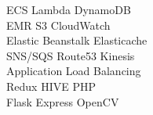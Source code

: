 \documentclass[]{deedy-resume-openfont}
\begin{document}
\begin{minipage}[t]{0.33\textwidth}
ECS \textbullet{} Lambda \textbullet{} DynamoDB  \\
EMR \textbullet{} S3 \textbullet{} CloudWatch \\
Elastic Beanstalk \textbullet{} Elasticache  \\
SNS/SQS \textbullet{} Route53 \textbullet{} Kinesis \\
Application Load Balancing \\

Redux \textbullet{} HIVE  \textbullet{} PHP \\
Flask \textbullet{} Express \textbullet{} OpenCV \\


\sectionsep

%
%

\end{minipage} 
\hfill
\end{document}
